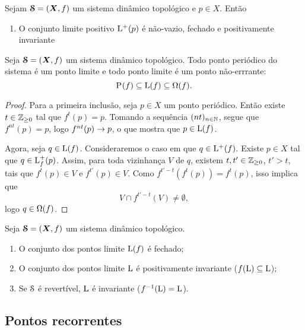 \begin{proposition}
Sejam $\bm{\mathcal{S}}=(\bm X,f)$ um sistema dinâmico topológico e $p \in X$. Então
	\begin{enumerate}
	\item O conjunto limite positivo $\mathrm{L}^+(p)$ é não-vazio, fechado e positivamente invariante
	\end{enumerate}
\end{proposition}

\begin{proposition}
Seja $\bm{\mathcal{S}}=(\bm X,f)$ um sistema dinâmico topológico. Todo ponto periódico do sistema é um ponto limite e todo ponto limite é um ponto não-errrante:
	\begin{equation*}
	\mathrm{P}^{}(f) \subseteq \mathrm{L}(f) \subseteq \Omega(f).
	\end{equation*}
\end{proposition}
\begin{proof}
Para a primeira inclusão, seja $p \in X$ um ponto periódico. Então existe $t \in \mathbb{Z}_{\geq 0}$ tal que $f^t(p)=p$. Tomando a sequência $(nt)_{n \in \mathbb{N}}$, segue que $f^{nt}(p) = p$, logo $f^{nt}(p) \rightarrow p$, o que mostra que $p \in \mathrm{L}(f)$.

Agora, seja $q \in \mathrm{L}(f)$. Consideraremos o caso em que $q \in \mathrm{L}^+(f)$. Existe $p \in X$ tal que $q \in \mathrm{L}^+_f(p)$. Assim,  para toda vizinhança $V$ de $q$, existem $t,t' \in \mathbb{Z}_{\geq 0}$, $t'>t$, tais que $f^t(p) \in V$ e $f^{t'}(p) \in V$. Como $f^{t'-t}(f^t(p)) = f^t(p)$, isso implica que
	\begin{equation*}
	V \cap f^{t'-t}(V) \neq \emptyset,
	\end{equation*}
logo $q \in \Omega(f)$.
\end{proof}


\begin{proposition}
Seja $\bm{\mathcal{S}}=(\bm X,f)$ um sistema dinâmico topológico.
	\begin{enumerate}
	\item O conjunto dos pontos limite $\mathrm{L}(f)$ é fechado;
	\item O conjunto dos pontos limite $\mathrm{L}$ é positivamente invariante ($f(\mathrm{L}) \subseteq \mathrm{L}$);
	\item Se $\mathcal{S}$ é revertível, $\mathrm{L}$ é invariante ($f^{-1}(\mathrm{L}) = \mathrm{L}$).
	\end{enumerate}
\end{proposition}

\subsection{Pontos recorrentes}

